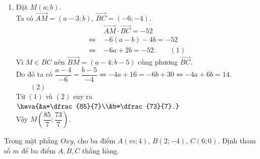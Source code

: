 \begin{bt}
{\begin{enumerate}
{
		}
		Vậy $D\left(-\dfrac{2}{3};-1\right)$.
		\item Đặt $M(a;b)$.\\
		Ta có $\overrightarrow{AM}=(a-3;b)$, $\overrightarrow{BC}=(-6;-4)$.\\
		\allowdisplaybreaks
		\begin{align*}
			&\overrightarrow{AM}\cdot \overrightarrow{BC}= -52
			\\
			\Leftrightarrow\,\,&-6(a-b)-4b=-52
			\\
			\Leftrightarrow\,\,&-6a+2b=-52. \qquad(1)
		\end{align*}
		Vì $M\in BC$ nên $\overrightarrow{BM}=(a-4;b-5)$ cùng phương $\overrightarrow{BC}$.\\
		Do đó ta có $\dfrac{a-4}{-6}=\dfrac{b-5}{-4}\Leftrightarrow -4a+16=-6b+30\Leftrightarrow -4a+6b=14$. $\qquad(2)$\\
		Từ $(1)$ và $(2)$ suy ra $\heva{&a=\dfrac{85}{7}\\&b=\dfrac{73}{7}.}$\\
		Vậy $M\left(\dfrac{85}{7};\dfrac{73}{7}\right)$.
	\end{enumerate}
	}
\end{bt}

\begin{bt}%
	Trong mặt phẳng $Oxy$, cho ba điểm $A(m;4)$, $B(2;-4)$, $C(6;0)$.
	Định tham số $m$ để ba điểm $A, B, C$ thẳng hàng.
\end{bt}

